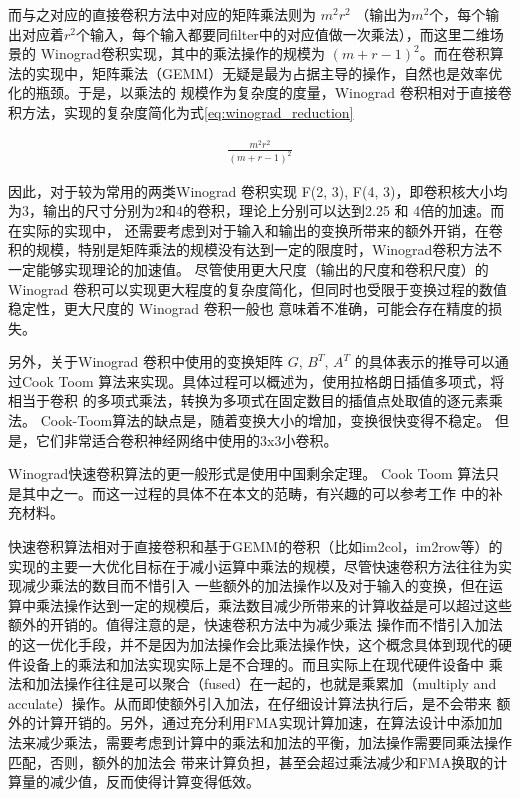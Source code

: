 而与之对应的直接卷积方法中对应的矩阵乘法则为 $m^2r^2$ （输出为$m^2$个，每个输出对应着$r^2$个输入，每个输入都要同filter中的对应值做一次乘法），而这里二维场景的
Winograd卷积实现，其中的乘法操作的规模为 $( m + r - 1)^2$。而在卷积算法的实现中，矩阵乘法（GEMM）无疑是最为占据主导的操作，自然也是效率优化的瓶颈。于是，以乘法的
规模作为复杂度的度量，Winograd 卷积相对于直接卷积方法，实现的复杂度简化为式\ref{eq:winograd_reduction}

\begin{align}
  \label{eq:winograd_reduction}
  \frac{m^2r^2}{(m+r-1)^2}
\end{align}

因此，对于较为常用的两类Winograd 卷积实现 F(2, 3), F(4, 3)，即卷积核大小均为3，输出的尺寸分别为2和4的卷积，理论上分别可以达到2.25 和 4倍的加速。而在实际的实现中，
还需要考虑到对于输入和输出的变换所带来的额外开销，在卷积的规模，特别是矩阵乘法的规模没有达到一定的限度时，Winograd卷积方法不一定能够实现理论的加速值。
尽管使用更大尺度（输出的尺度和卷积尺度）的Winograd 卷积可以实现更大程度的复杂度简化，但同时也受限于变换过程的数值稳定性，更大尺度的 Winograd 卷积一般也
意味着不准确，可能会存在精度的损失。

另外，关于Winograd 卷积中使用的变换矩阵 $G$, $B^T$, $A^T$ 的具体表示的推导可以通过Cook Toom 算法来实现。具体过程可以概述为，使用拉格朗日插值多项式，将相当于卷积
的多项式乘法，转换为多项式在固定数目的插值点处取值的逐元素乘法。 Cook-Toom算法的缺点是，随着变换大小的增加，变换很快变得不稳定。 但是，它们非常适合卷积神经网络中使用的3x3小卷积。

Winograd快速卷积算法的更一般形式是使用中国剩余定理。 Cook Toom 算法只是其中之一。而这一过程的具体不在本文的范畴，有兴趣的可以参考工作\cite{Lavin2015FastAF} 中的补充材料。


快速卷积算法相对于直接卷积和基于GEMM的卷积（比如im2col，im2row等）的实现的主要一大优化目标在于减小运算中乘法的规模，尽管快速卷积方法往往为实现减少乘法的数目而不惜引入
一些额外的加法操作以及对于输入的变换，但在运算中乘法操作达到一定的规模后，乘法数目减少所带来的计算收益是可以超过这些额外的开销的。值得注意的是，快速卷积方法中为减少乘法
操作而不惜引入加法的这一优化手段，并不是因为加法操作会比乘法操作快，这个概念具体到现代的硬件设备上的乘法和加法实现实际上是不合理的。而且实际上在现代硬件设备中
乘法和加法操作往往是可以聚合（fused）在一起的，也就是乘累加（multiply and acculate）操作。从而即使额外引入加法，在仔细设计算法执行后，是不会带来 额外的计算开销的。另外，通过充分利用FMA实现计算加速，在算法设计中添加加法来减少乘法，需要考虑到计算中的乘法和加法的平衡，加法操作需要同乘法操作匹配，否则，额外的加法会
带来计算负担，甚至会超过乘法减少和FMA换取的计算量的减少值，反而使得计算变得低效。

